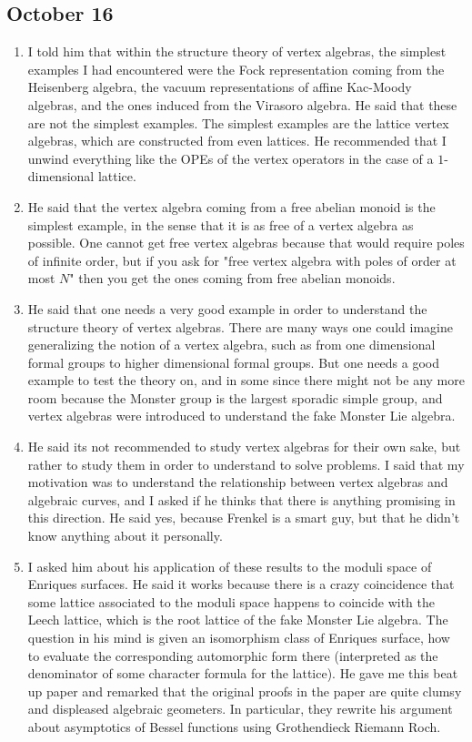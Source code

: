 \documentclass[12pt]{article}
\begin{document}
\subsection*{October 16}
\begin{enumerate}
    \item I told him that within the structure theory of vertex algebras, the simplest examples I had encountered were the Fock representation coming from the Heisenberg algebra, the vacuum representations of affine Kac-Moody algebras, and the ones induced from the Virasoro algebra. He said that these are not the simplest examples. The simplest examples are the lattice vertex algebras, which are constructed from even lattices. He recommended that I unwind everything like the OPEs of the vertex operators in the case of a $1$-dimensional lattice. 
    \item He said that the vertex algebra coming from a free abelian monoid is the simplest example, in the sense that it is as free of a vertex algebra as possible. One cannot get free vertex algebras because that would require poles of infinite order, but if you ask for "free vertex algebra with poles of order at most $N$" then you get the ones coming from free abelian monoids. 
    \item He said that one needs a very good example in order to understand the structure theory of vertex algebras. There are many ways one could imagine generalizing the notion of a vertex algebra, such as from one dimensional formal groups to higher dimensional formal groups. But one needs a good example to test the theory on, and in some since there might not be any more room because the Monster group is the largest sporadic simple group, and vertex algebras were introduced to understand the fake Monster Lie algebra.
    \item He said its not recommended to study vertex algebras for their own sake, but rather to study them in order to understand to solve problems. I said that my motivation was to understand the relationship between vertex algebras and algebraic curves, and I asked if he thinks that there is anything promising in this direction. He said yes, because Frenkel is a smart guy, but that he didn't know anything about it personally.
    \item I asked him about his application of these results to the moduli space of Enriques surfaces. He said it works because there is a crazy coincidence that some lattice associated to the moduli space happens to coincide with the Leech lattice, which is the root lattice of the fake Monster Lie algebra. The question in his mind is given an isomorphism class of Enriques surface, how to evaluate the corresponding automorphic form there (interpreted as the denominator of some character formula for the lattice). He gave me this beat up paper and remarked that the original proofs in the paper are quite clumsy and displeased algebraic geometers. In particular, they rewrite his argument about asymptotics of Bessel functions using Grothendieck Riemann Roch.
\end{enumerate}
\end{document}
